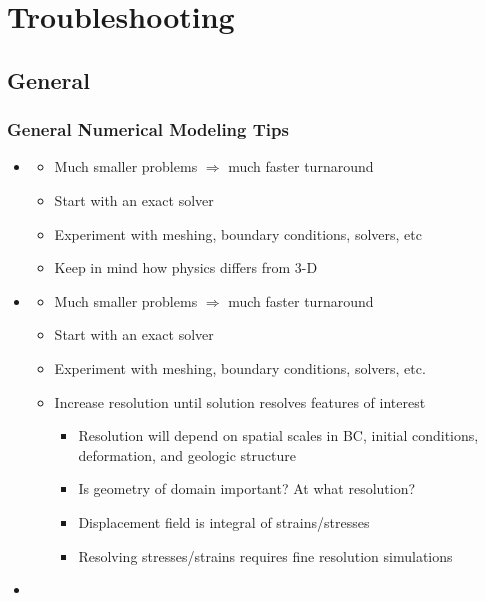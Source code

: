 \documentclass[aspectratio=169]{beamer}
\begin{document}
\section{Troubleshooting}
\subsection{General}

\begin{frame}
  \frametitle{General Numerical Modeling Tips}
  
  \begin{itemize}
  \item {}
    \begin{itemize}
    \item Much smaller problems $\Rightarrow$ much faster turnaround
    \item Start with an exact solver
    \item Experiment with meshing, boundary conditions, solvers, etc
    \item Keep in mind how physics differs from 3-D
    \end{itemize}
  \item {}
    \begin{itemize}
    \item Much smaller problems $\Rightarrow$ much faster turnaround
    \item Start with an exact solver
    \item Experiment with meshing, boundary conditions, solvers, etc.
    \item Increase resolution until solution resolves features of interest
      \begin{itemize}
      \item Resolution will depend on spatial scales in BC, initial
        conditions, deformation, and geologic structure
      \item Is geometry of domain important? At what resolution?
      \item Displacement field is integral of strains/stresses
      \item Resolving stresses/strains requires fine resolution simulations
      \end{itemize}
    \end{itemize}
  \item {}
  \end{itemize}
  
\end{frame}
\end{document}
